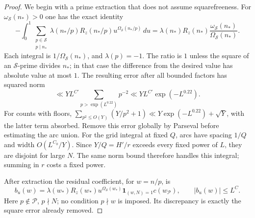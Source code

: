 \documentclass[11pt]{article}
\theoremstyle{definition}
\newcommand{\ind}{\mathbf 1}
\newcommand{\Pset}{\mathcal P}
\newcommand{\Sset}{\mathcal S}
\newcommand{\Rz}{R_z}
\theoremstyle{remark}
\begin{document}
\begin{proof}
We begin with a prime extraction that does not assume squarefreeness.
For $\omega_{\Sset}(n_*)>0$ one has the exact identity
\begin{equation}\label{eq:reserved-extraction}
-\int_0^1\sum_{\substack{p\in\Sset\\p\mid n_*}}
\lambda(n_*/p)\Rz(n_*/p)
 u^{\Omega_{\Sset}(n_*/p)}\,du
=\lambda(n_*)\Rz(n_*)
 \frac{\omega_{\Sset}(n_*)}{\Omega_{\Sset}(n_*)}.
\end{equation}
Each integral is $1/\Omega_{\Sset}(n_*)$, and $\lambda(p)=-1$.
The ratio is $1$ unless the square of an $\Sset$-prime divides $n_*$;
in that case the difference from the desired value has absolute value
at most $1$.
The resulting error after all bounded factors has squared norm
\begin{equation}\label{eq:square-error}
\ll YL^{C'}\sum_{p>\exp(L^{0.22})}p^{-2}
\ll YL^{C'}\exp(-L^{0.22}).
\end{equation}
For counts with floors,
$\sum_{p^2\le O(Y)}(Y/p^2+1)
 \ll Y\exp(-L^{0.22})+\sqrt Y$, with the latter term absorbed.
Remove this error globally by Parseval before estimating the arc
union. For the grid integral at fixed $Q$, arcs have spacing $1/Q$
and width $O(L^{C_0}/Y)$. Since $Y/Q=H'/r$ exceeds every fixed
power of $L$, they are disjoint for large $N$. The same norm bound
therefore handles this integral; summing in $r$ costs a fixed power.

After extraction the residual coefficient, for $w=n/p$, is
\begin{equation}\label{eq:residual-coefficient}
b_u(w)=\lambda(w_*)\Rz(w_*)u^{\Omega_{\Sset}(w_*)}
       \ind_{(w,N)=1}c(w_{\Pset}),\qquad |b_u(w)|\le L^C.
\end{equation}
Here $p\notin\Pset$, $p\nmid N$; no condition $p\nmid w$ is imposed.
Its discrepancy is exactly the square error already removed.


\end{proof}
\end{document}
